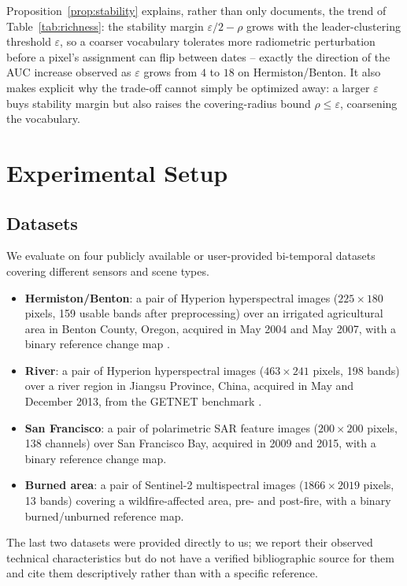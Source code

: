 \documentclass[11pt]{article}
\begin{document}
Proposition~\ref{prop:stability} explains, rather than only documents, the trend of Table~\ref{tab:richness}: the stability margin $\varepsilon/2-\rho$ grows with the leader-clustering threshold $\varepsilon$, so a coarser vocabulary tolerates more radiometric perturbation before a pixel's assignment can flip between dates -- exactly the direction of the AUC increase observed as $\varepsilon$ grows from $4$ to $18$ on Hermiston/Benton. It also makes explicit why the trade-off cannot simply be optimized away: a larger $\varepsilon$ buys stability margin but also raises the covering-radius bound $\rho\le\varepsilon$, coarsening the vocabulary.

\section{Experimental Setup}

\subsection{Datasets}
\label{sec:datasets}

We evaluate on four publicly available or user-provided bi-temporal datasets covering different sensors and scene types.

\begin{itemize}
\item \textbf{Hermiston/Benton}: a pair of Hyperion hyperspectral images ($225 \times 180$ pixels, 159 usable bands after preprocessing) over an irrigated agricultural area in Benton County, Oregon, acquired in May 2004 and May 2007, with a binary reference change map \citep{liu2019review}.
\item \textbf{River}: a pair of Hyperion hyperspectral images ($463 \times 241$ pixels, 198 bands) over a river region in Jiangsu Province, China, acquired in May and December 2013, from the GETNET benchmark \citep{wang2019getnet}.
\item \textbf{San Francisco}: a pair of polarimetric SAR feature images ($200 \times 200$ pixels, 138 channels) over San Francisco Bay, acquired in 2009 and 2015, with a binary reference change map.
\item \textbf{Burned area}: a pair of Sentinel-2 multispectral images ($1866 \times 2019$ pixels, 13 bands) covering a wildfire-affected area, pre- and post-fire, with a binary burned/unburned reference map.
\end{itemize}

The last two datasets were provided directly to us; we report their observed technical characteristics but do not have a verified bibliographic source for them and cite them descriptively rather than with a specific reference.
\end{document}
